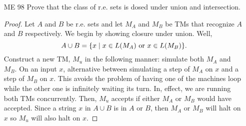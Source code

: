 \documentclass{article}
\newcommand{\setst}{\hspace{1mm} | \hspace{1mm} }
\theoremstyle{definition}
\begin{document}
\begin{enumerate}
\begin{proof}
		Conversely, assume that $E$ enumerates a set $A$ in increasing order. We will simulate $E$ with a three tape TM $M$ where $E$ is simulated on the bottom two tapes and the input is on the first tape. We begin simulating $E$ and every time $E$ enumerates a string, we check two conditions. If the input $x$ is equal to the enumerated string $e$, then, the $M$ accepts $x$ and halts. If $e$ is greater than $x$, then we have already passed the place where $x$ would be enumerated so it cannot be in $L(E)$. Since the order is computable Thus, $M$ rejects on $x$ and halts. Otherwise, continue simulating $E$.
	\end{proof}
	\item[ME 98] Prove that the class of r.e. sets is dosed under union and intersection.
	\begin{proof}
		Let $A$ and $B$ be r.e. sets and let $M_A$ and $M_B$ be TMs that recognize $A$ and $B$ respectively. We begin by showing closure under union. Well,
		\[A \cup B = \{x \setst x \in L(M_A) \text{ or } x \in L(M_B)\}.\]
		Construct a new TM, $M_u$ in the following manner: simulate both $M_A$ and $M_B$. On an input $x$, alternative between simulating a step of $M_A$ on $x$ and a step of $M_B$ on $x$. This avoids the problem of having one of the machines loop while the other one is infinitely waiting its turn. In, effect, we are running both TMs concurrently. Then, $M_u$ accepts if either $M_A$ or $M_B$ would have accepted. Since a string $x$ in $A \cup B$ is in $A$ or $B$, then $M_A$ or $M_B$ will halt on $x$ so $M_u$ will also halt on $x$.
		

\end{proof}
\end{enumerate}
\end{document}
